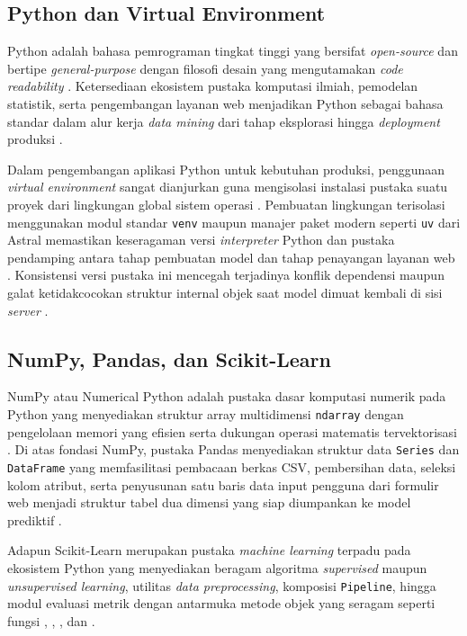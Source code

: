\documentclass[a4paper,oneside,11pt]{book}
\begin{document}
\subsection{Python dan Virtual Environment}
\par Python adalah bahasa pemrograman tingkat tinggi yang bersifat \textit{open-source} dan bertipe \textit{general-purpose} dengan filosofi desain yang mengutamakan \textit{code readability} \cite{telkom_python, dicoding_python}. Ketersediaan ekosistem pustaka komputasi ilmiah, pemodelan statistik, serta pengembangan layanan web menjadikan Python sebagai bahasa standar dalam alur kerja \textit{data mining} dari tahap eksplorasi hingga \textit{deployment} produksi \cite{python_docs, han2022data}.
\par Dalam pengembangan aplikasi Python untuk kebutuhan produksi, penggunaan \textit{virtual environment} sangat dianjurkan guna mengisolasi instalasi pustaka suatu proyek dari lingkungan global sistem operasi \cite{python_packaging_venv}. Pembuatan lingkungan terisolasi menggunakan modul standar \texttt{venv} maupun manajer paket modern seperti \texttt{uv} dari Astral memastikan keseragaman versi \textit{interpreter} Python dan pustaka pendamping antara tahap pembuatan model dan tahap penayangan layanan web \cite{python_packaging_venv, astral_uv}. Konsistensi versi pustaka ini mencegah terjadinya konflik dependensi maupun galat ketidakcocokan struktur internal objek saat model dimuat kembali di sisi \textit{server} \cite{scikit_persistence}.

\subsection{NumPy, Pandas, dan Scikit-Learn}
\par NumPy atau Numerical Python adalah pustaka dasar komputasi numerik pada Python yang menyediakan struktur array multidimensi \texttt{ndarray} dengan pengelolaan memori yang efisien serta dukungan operasi matematis tervektorisasi \cite{dqlab_numpy, ruangguru_numpy}. Di atas fondasi NumPy, pustaka Pandas menyediakan struktur data \texttt{Series} dan \texttt{DataFrame} yang memfasilitasi pembacaan berkas CSV, pembersihan data, seleksi kolom atribut, serta penyusunan satu baris data input pengguna dari formulir web menjadi struktur tabel dua dimensi yang siap diumpankan ke model prediktif \cite{datacamp_pandas, dqlab_pandas}.
\par Adapun Scikit-Learn merupakan pustaka \textit{machine learning} terpadu pada ekosistem Python yang menyediakan beragam algoritma \textit{supervised} maupun \textit{unsupervised learning}, utilitas \textit{data preprocessing}, komposisi \texttt{Pipeline}, hingga modul evaluasi metrik dengan antarmuka metode objek yang seragam seperti fungsi , , , dan  \cite{pedregosa2011scikit, scikit_classification}.
\end{document}
